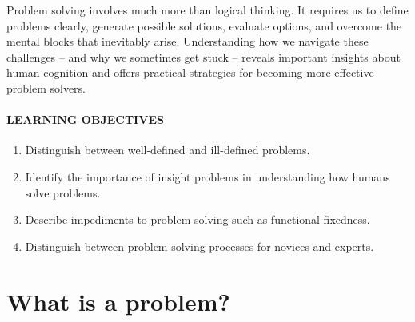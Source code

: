 \documentclass[
]{krantz}
\providecommand{\tightlist}{%
  \setlength{\itemsep}{0pt}\setlength{\parskip}{0pt}}
\begin{document}
Problem solving involves much more than logical thinking. It requires us to define problems clearly, generate possible solutions, evaluate options, and overcome the mental blocks that inevitably arise. Understanding how we navigate these challenges -- and why we sometimes get stuck -- reveals important insights about human cognition and offers practical strategies for becoming more effective problem solvers.

\paragraph*{LEARNING OBJECTIVES}\label{learning-objectives-9}

\begin{enumerate}
\def\labelenumi{\arabic{enumi}.}
\tightlist
\item
  Distinguish between well-defined and ill-defined problems.
\item
  Identify the importance of insight problems in understanding how humans solve problems.
\item
  Describe impediments to problem solving such as functional fixedness.
\item
  Distinguish between problem-solving processes for novices and experts.
\end{enumerate}

\section{What is a problem?}\label{what-is-a-problem}
\end{document}
